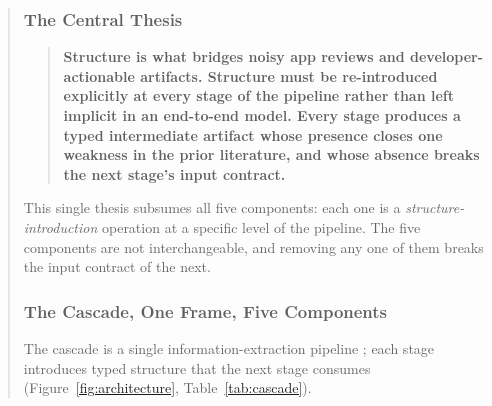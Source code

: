 \documentclass[sigconf, nonacm, anonymous, balance=false]{acmart}
\begin{document}
\begin{abstract}
\subsubsection{The Central Thesis}\label{the-central-thesis}

\begin{quote}
\textbf{Structure is what bridges noisy app reviews and developer-actionable artifacts. Structure must be re-introduced explicitly at every stage of the pipeline rather than left implicit in an end-to-end model. Every stage produces a typed intermediate artifact whose presence closes one weakness in the prior literature, and whose absence breaks the next stage's input contract.}
\end{quote}

This single thesis subsumes all five components: each one is a \emph{structure-introduction} operation at a specific level of the pipeline. The five components are not interchangeable, and removing any one of them breaks the input contract of the next.

\subsubsection{The Cascade, One Frame, Five Components}\label{the-cascade-one-frame-five-components}

The cascade is a single information-extraction pipeline \cite{hearst1999, sarawagi2008}; each stage introduces typed structure that the next stage consumes (Figure~\ref{fig:architecture}, Table~\ref{tab:cascade}).


\end{abstract}
\end{document}
